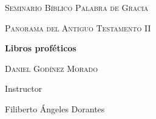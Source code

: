 
%


\begin{titlepage}
	\begin{center}
		\vspace*{1cm}

		{\scshape\LARGE Seminario Bíblico Palabra de Gracia \par}
		\vspace{1cm}
		{\scshape\Large Panorama del Antiguo Testamento II \par}
		\vspace{1.5cm}
		{\huge\bfseries Libros proféticos \par}
		\vspace{2cm}
		{\Large\scshape Daniel Godínez Morado \par}
		\vfill
		Instructor\par
		Filiberto Ángeles Dorantes
		\vfill

		{\large {}}
	\end{center}

\end{titlepage}
%


